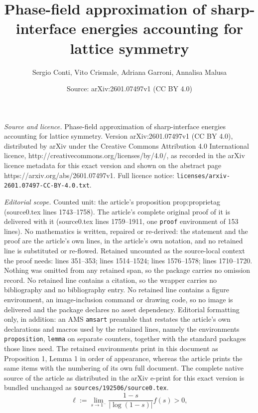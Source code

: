 \documentclass[10pt,a4paper]{amsart}
\title{Phase-field approximation of sharp-interface energies accounting for lattice symmetry}
\author{Sergio Conti, Vito Crismale, Adriana Garroni, Annalisa Malusa}
\date{Source: arXiv:2601.07497v1 (CC BY 4.0)}
\begin{document}
\maketitle

\noindent\emph{Source and licence.} Phase-field approximation of sharp-interface energies accounting for lattice symmetry. Version arXiv:2601.07497v1 (CC BY 4.0), distributed by arXiv under the Creative Commons Attribution 4.0 International licence, http://creativecommons.org/licenses/by/4.0/, as recorded in the arXiv licence metadata for this exact version and shown on the abstract page https://arxiv.org/abs/2601.07497v1. Full licence notice: \texttt{licenses/arxiv-2601.07497-CC-BY-4.0.txt}.\par\smallskip

\noindent\textit{Editorial scope.} Counted unit: the article's proposition prop:proprietag (source0.tex lines 1743--1758). The article's complete original proof of it is delivered with it (source0.tex lines 1759--1911, one \texttt{proof} environment of 153 lines). No mathematics is written, repaired or re-derived: the statement and the proof are the article's own lines, in the article's own notation, and no retained line is substituted or re-flowed.  Retained uncounted as the source-local context the proof needs: lines 351--353; lines 1514--1524; lines 1576--1578; lines 1710--1720.  Nothing was omitted from any retained span, so the package carries no omission record.  No retained line contains a citation, so the wrapper carries no bibliography and no bibliography entry.  No retained line contains a figure environment, an image-inclusion command or drawing code, so no image is delivered and the package declares no asset dependency.  Editorial formatting only, in addition: an AMS \texttt{amsart} preamble that restates the article's own declarations and macros used by the retained lines, namely the environments \texttt{proposition}, \texttt{lemma} on separate counters, together with the standard packages those lines need.  The retained environments print in this document as Proposition 1, Lemma 1 in order of appearance, whereas the article prints the same items with the numbering of its own full document.  The complete native source of the article as distributed in the arXiv e-print for this exact version is bundled unchanged as \texttt{sources/192506/source0.tex}.
\begin{equation}\label{0405230818}
	\ell:=\lim_{s\to 1^-} \frac{1-s}{|\log(1-s)|}f(s)>0, 
\end{equation}
\end{document}
